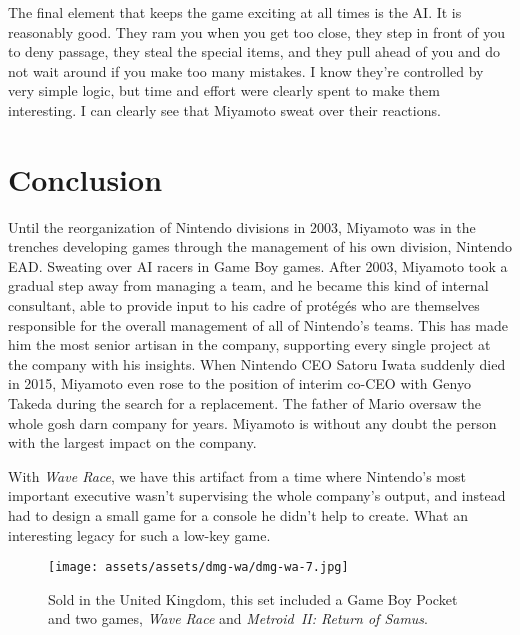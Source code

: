 \documentclass{book}
\begin{document}
The final element that keeps the game exciting at all times is the AI. It is reasonably good. They ram you when you get too close, they step in front of you to deny passage, they steal the special items, and they pull ahead of you and do not wait around if you make too many mistakes. I know they’re controlled by very simple logic, but time and effort were clearly spent to make them interesting. I can clearly see that Miyamoto sweat over their reactions.

\FloatBarrier\needspace{10mm}\section*{Conclusion}\nopagebreak[4]

Until the reorganization of Nintendo divisions in 2003, Miyamoto was in the trenches developing games through the management of his own division, Nintendo EAD. Sweating over AI racers in Game Boy games. After 2003, Miyamoto took a gradual step away from managing a team, and he became this kind of internal consultant, able to provide input to his cadre of protégés who are themselves responsible for the overall management of all of Nintendo’s teams. This has made him the most senior artisan in the company, supporting every single project at the company with his insights. When Nintendo CEO Satoru Iwata suddenly died in 2015, Miyamoto even rose to the position of interim co-CEO with Genyo Takeda during the search for a replacement. The father of Mario oversaw the whole gosh darn company for years. Miyamoto is without any doubt the person with the largest impact on the company.

With \emph{Wave Race}, we have this artifact from a time where Nintendo’s most important executive wasn’t supervising the whole company’s output, and instead had to design a small game for a console he didn’t help to create. What an interesting legacy for such a low-key game.

\begin{figure}[hbt]
\vskip 10pt
\centering \texttt{[image: assets/assets/dmg-wa/dmg-wa-7.jpg]}\par\pagetwodescription Sold in the United Kingdom, this set included a Game Boy Pocket and two games, \emph{Wave Race} and \emph{Metroid II: Return of Samus}.
\vskip 6pt
\end{figure}
\end{document}
